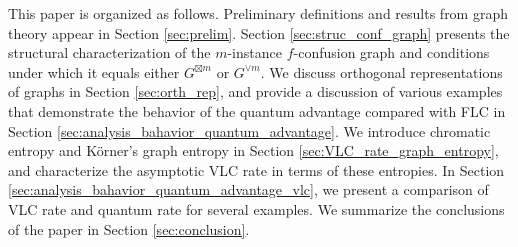 \documentclass[journal, onecolumn, draftcls]{IEEEtran}
\theoremstyle{definition}
\newcommand{\meng}[1]{\marginpar{+}{\bf Ruoyu's remark}: {\em #1}}
\newcommand{\aditya}[1]{\marginpar{+}{\bf Aditya's remark}: {\em #1}}
\begin{document}
This paper is organized as follows. Preliminary definitions and results from graph theory appear in Section \ref{sec:prelim}. Section \ref{sec:struc_conf_graph} presents the structural characterization of the $m$-instance $f$-confusion graph and conditions under which it equals either $G^{\boxtimes m}$ or $G^{\lor m}$. We discuss orthogonal representations of graphs in Section \ref{sec:orth_rep}, and provide a discussion of various examples that demonstrate the behavior of the quantum advantage compared with FLC in Section \ref{sec:analysis_bahavior_quantum_advantage}. We introduce chromatic entropy and K\"orner's graph entropy in Section \ref{sec:VLC_rate_graph_entropy}, and   characterize  the asymptotic VLC rate in terms of these entropies. In Section \ref{sec:analysis_bahavior_quantum_advantage_vlc}, we present a comparison of VLC rate and quantum rate for several examples. We summarize the conclusions of the paper in Section \ref{sec:conclusion}. %


 
 

 
\end{document}
